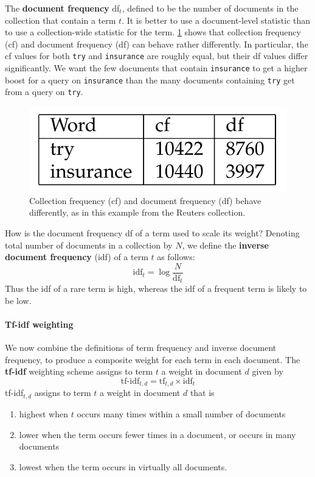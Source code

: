 \documentclass[letterpaper,11pt]{article}
\newcommand{\code}[1]{\texttt{#1}}
\begin{document}
The \textbf{document frequency} df$_t$, defined to be the number of documents in the collection that contain a term $t$. It is better to use a document-level statistic than to use a collection-wide statistic for the term. \ref{figure_25} shows that collection frequency (cf) and document frequency (df) can behave rather differently. In particular, the cf values for both \code{try} and \code{insurance} are roughly equal, but their df values differ significantly. We want the few documents that contain \code{insurance} to get a higher boost for a query on \code{insurance} than the many documents containing \code{try} get from a query on \code{try}.
\begin{figure}[H]
    \centering
    \includegraphics[scale=0.30]{sect6/figure_6_7.png}
    \caption{Collection frequency (cf) and document frequency (df) behave differently, as in this example from the Reuters collection.}
    \label{figure_25}
\end{figure}

How is the document frequency df of a term used to scale its weight? Denoting total number of documents in a collection by $N$, we define the \textbf{inverse document frequency} (idf) of a term $t$ as follows:
\[
\textrm{idf}_t=\log\frac{N}{\textrm{df}_t}
\]
Thus the idf of a rare term is high, whereas the idf of a frequent term is likely to be low.

\paragraph{Tf-idf weighting}
We now combine the definitions of term frequency and inverse document frequency, to produce a composite weight for each term in each document. The \textbf{tf-idf} weighting scheme assigns to term $t$ a weight in document $d$ given by
\[
\textrm{tf-idf}_{t,d}=\textrm{tf}_{t,d}\times \textrm{idf}_{t}
\]
tf-idf$_{t,d}$ assigns to term $t$ a weight in document $d$ that is
\begin{enumerate}
    \item highest when $t$ occurs many times within a small number of documents
    \item lower when the term occurs fewer times in a document, or occurs in many documents
    \item lowest when the term occurs in virtually all documents.
\end{enumerate}
\end{document}
